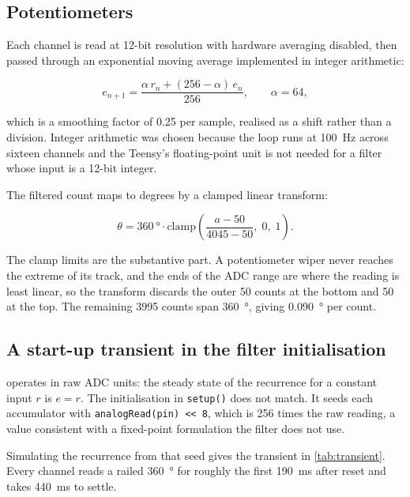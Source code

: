 \subsection{Potentiometers}

Each channel is read at 12-bit resolution with hardware averaging disabled,
then passed through an exponential moving average implemented in integer
arithmetic:

\begin{equation}
  e_{n+1} = \frac{\alpha\, r_n + (256 - \alpha)\, e_n}{256},
  \qquad \alpha = 64,
  \label{eq:ema}
\end{equation}

which is a smoothing factor of \num{0.25} per sample, realised as a shift
rather than a division. Integer arithmetic was chosen because the loop runs at
\SI{100}{\hertz} across sixteen channels and the Teensy's floating-point unit
is not needed for a filter whose input is a 12-bit integer.

The filtered count maps to degrees by a clamped linear transform:

\begin{equation}
  \theta = \SI{360}{\degree} \cdot
  \mathrm{clamp}\!\left(\frac{a - 50}{4045 - 50},\; 0,\; 1\right).
  \label{eq:adc2deg}
\end{equation}

The clamp limits are the substantive part. A potentiometer wiper never reaches
the extreme of its track, and the ends of the ADC range are where the reading
is least linear, so the transform discards the outer \num{50} counts at the
bottom and \num{50} at the top. The remaining \num{3995} counts span
\SI{360}{\degree}, giving \SI{0.090}{\degree} per count.

\subsection{A start-up transient in the filter initialisation}

 operates in raw ADC units: the steady state of the recurrence
for a constant input $r$ is $e = r$. The initialisation in \texttt{setup()}
does not match. It seeds each accumulator with \texttt{analogRead(pin) << 8},
which is \num{256} times the raw reading, a value consistent with a
fixed-point formulation the filter does not use.

Simulating the recurrence from that seed gives the transient in
\cref{tab:transient}. Every channel reads a railed \SI{360}{\degree} for
roughly the first \SI{190}{\milli\second} after reset and takes
\SI{440}{\milli\second} to settle.

